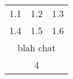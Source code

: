 \begin{tabular}{l|l|l} 
   1.1 & 1.2 & 1.3 \\
   1.4 & 1.5 & 1.6 \\
\multicolumn{3}{|c|}{blah chat}\\
\multicolumn{3}{|c|}{4}\\
\end{tabular}
